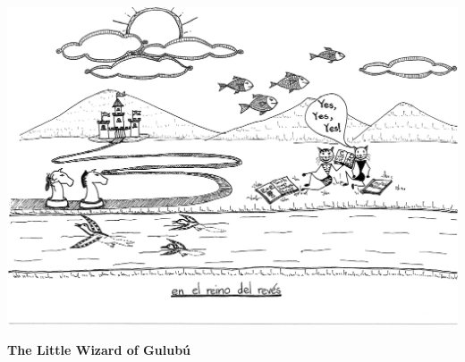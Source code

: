 \documentclass[11pt,a4paper]{article}
\begin{document}
\bigskip
\centerline{\includegraphics[page=3,scale=0.8,clip=true,trim = 4cm 3mm 0in 0in]{20150406235752619.pdf}}
\begin{center}\large\textbf{The Little Wizard of Gulub\'u}\end{center}
\end{document}
